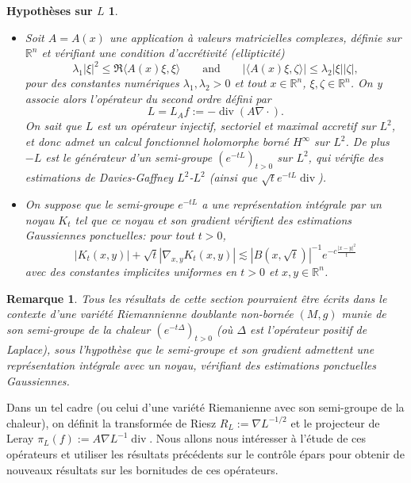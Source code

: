 \documentclass[11pt]{amsart}
\newtheorem*{remark}{Remarque}
\newtheorem*{assum-L}{Hypoth\`eses sur $L$}
\DeclareMathOperator{\dive}{div}
\newcommand{\rr}{\mathbb}
\begin{document}
\begin{assum-L}
\begin{itemize}
\item[$\bullet$] Soit $A = A(x)$ une application \`a valeurs matricielles complexes, d\'efinie sur ${\rr R}^n$ et v\'erifiant une condition d'accr\'etivit\'e (ellipticit\'e)
\begin{equation} \lambda_1 |\xi|^ 2 \leq  \Re \langle A(x) \xi, \xi \rangle \qquad \textrm{and} \qquad  |\langle A(x)\xi , \zeta\rangle | \leq \lambda_2 |\xi||\zeta|, \label{eq:ell} \end{equation}
pour des constantes num\'eriques $\lambda_1,\lambda_2>0$ et tout $x\in {\rr R}^n$, $\xi,\zeta\in {\rr R}^n$. On y associe alors l'op\'erateur du second ordre d\'efini par
$$ L=L_A f :=- \dive (A\nabla \cdot ).$$
On sait que $L$ est un op\'erateur injectif, sectoriel et maximal accretif sur $L^2$, et donc admet un calcul fonctionnel holomorphe born\'e $H^\infty$ sur $L^2$. De plus $-L$ est le g\'en\'erateur d'un semi-groupe $(e^{-tL})_{t>0}$ sur $L^2$, qui v\'erifie des estimations de Davies-Gaffney $L^2$-$L^2$ (ainsi que $ \sqrt{t} e^{-tL} \dive$).

\item[$\bullet$] On suppose que le semi-groupe $e^{-tL}$ a une repr\'esentation int\'egrale par un noyau $K_t$ tel que ce noyau et son gradient v\'erifient des estimations Gaussiennes ponctuelles: pour tout $t>0$, 
\begin{equation} \left|K_t(x,y)\right| +  \sqrt{t} \left| \nabla_{x,y} K_t(x,y)\right| \lesssim |B(x,\sqrt{t})|^{-1} e^{-c \frac{|x-y|^2}{t} }
\label{eq:gaussian}
\end{equation}
avec des constantes implicites uniformes en $t>0$ et $x,y\in {\rr R}^n$.
\end{itemize}
\end{assum-L}

\begin{remark} Tous les r\'esultats de cette section pourraient \^etre \'ecrits dans le contexte d'une vari\'et\'e Riemannienne doublante non-born\'ee $(M,g)$ munie de son semi-groupe de la chaleur $(e^{-t\Delta})_{t>0}$ (o\`u $\Delta$ est l'op\'erateur positif de Laplace), sous l'hypoth\`ese que le semi-groupe et son gradient admettent une repr\'esentation int\'egrale avec un noyau, v\'erifiant des estimations ponctuelles Gaussiennes.
\end{remark}

Dans un tel cadre (ou celui d'une vari\'et\'e Riemanienne avec son semi-groupe de la chaleur), on d\'efinit la transform\'ee de Riesz $R_L:=\nabla L^{-1/2}$ et le projecteur de Leray $ \pi_L(f) := A \nabla L^{-1} \dive$.
Nous allons nous int\'eresser \`a l'\'etude de ces op\'erateurs et utiliser les r\'esultats pr\'ec\'edents sur le contr\^ole \'epars pour obtenir de nouveaux r\'esultats sur les bornitudes de ces op\'erateurs.
\end{document}

